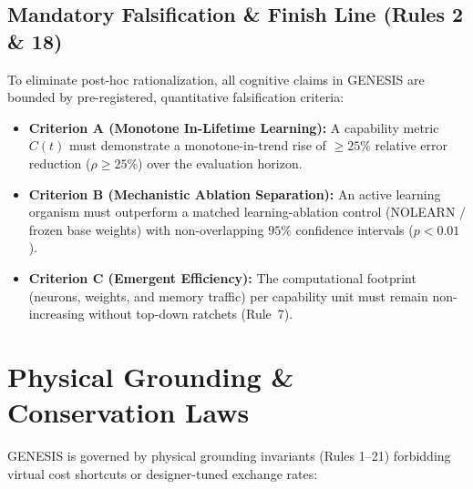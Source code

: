 \documentclass[10pt,journal,compsoc]{IEEEtran}
\begin{document}
\subsection{Mandatory Falsification \& Finish Line (Rules 2 \& 18)}
To eliminate post-hoc rationalization, all cognitive claims in GENESIS are bounded by pre-registered, quantitative falsification criteria:
\begin{itemize}
    \item \textbf{Criterion A (Monotone In-Lifetime Learning):} A capability metric $C(t)$ must demonstrate a monotone-in-trend rise of $\ge 25\%$ relative error reduction ($\rho \ge 25\%$) over the evaluation horizon.
    \item \textbf{Criterion B (Mechanistic Ablation Separation):} An active learning organism must outperform a matched learning-ablation control (NOLEARN / frozen base weights) with non-overlapping $95\%$ confidence intervals ($p < 0.01$).
    \item \textbf{Criterion C (Emergent Efficiency):} The computational footprint (neurons, weights, and memory traffic) per capability unit must remain non-increasing without top-down ratchets (Rule~7).
\end{itemize}

\section{Physical Grounding \& Conservation Laws}
\label{sec:physics}

GENESIS is governed by physical grounding invariants (Rules 1--21) forbidding virtual cost shortcuts or designer-tuned exchange rates:
\end{document}
